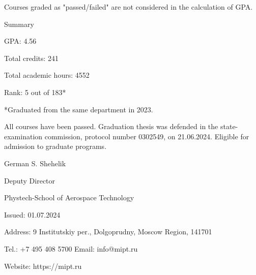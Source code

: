 \documentclass[a4paper, 11pt]{article}
\begin{document}
Courses graded as "passed/failed" are not considered in the calculation of GPA.

Summary

GPA: 4.56

Total credits: 241

Total academic hours: 4552

Rank: 5 out of 183*

*Graduated from the same department in 2023.

All courses have been passed. Graduation thesis was defended in the state-examination commission, protocol number 0302549, on 21.06.2024. Eligible for admission to graduate programs.

German S. Shehelik

Deputy Director

Phystech-School of Aerospace Technology

Issued: 01.07.2024

Address: 9 Institutskiy per., Dolgoprudny, Moscow Region, 141701

Tel.: +7 495 408 5700 Email: info@mipt.ru

Website: https://mipt.ru
\end{document}
